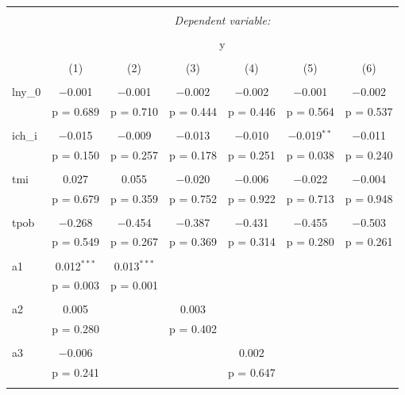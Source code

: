 \begin{table}[!htbp] \centering 
    \tiny
  \caption{} 
  \label{} 
  \begin{turn}{0}
\begin{tabular}{@{\extracolsep{5pt}}lcccccc} 
\\[-1.8ex]\hline 
\hline \\[-1.8ex] 
 & \multicolumn{6}{c}{\textit{Dependent variable:}} \\ 
\cline{2-7} 
\\[-1.8ex] & \multicolumn{6}{c}{y} \\ 
\\[-1.8ex] & (1) & (2) & (3) & (4) & (5) & (6)\\ 
\hline \\[-1.8ex] 
 lny\_0 & $-$0.001 & $-$0.001 & $-$0.002 & $-$0.002 & $-$0.001 & $-$0.002 \\ 
  & p = 0.689 & p = 0.710 & p = 0.444 & p = 0.446 & p = 0.564 & p = 0.537 \\ 
  & & & & & & \\ 
 ich\_i & $-$0.015 & $-$0.009 & $-$0.013 & $-$0.010 & $-$0.019$^{**}$ & $-$0.011 \\ 
  & p = 0.150 & p = 0.257 & p = 0.178 & p = 0.251 & p = 0.038 & p = 0.240 \\ 
  & & & & & & \\ 
 tmi & 0.027 & 0.055 & $-$0.020 & $-$0.006 & $-$0.022 & $-$0.004 \\ 
  & p = 0.679 & p = 0.359 & p = 0.752 & p = 0.922 & p = 0.713 & p = 0.948 \\ 
  & & & & & & \\ 
 tpob & $-$0.268 & $-$0.454 & $-$0.387 & $-$0.431 & $-$0.455 & $-$0.503 \\ 
  & p = 0.549 & p = 0.267 & p = 0.369 & p = 0.314 & p = 0.280 & p = 0.261 \\ 
  & & & & & & \\ 
 a1 & 0.012$^{***}$ & 0.013$^{***}$ &  &  &  &  \\ 
  & p = 0.003 & p = 0.001 &  &  &  &  \\ 
  & & & & & & \\ 
 a2 & 0.005 &  & 0.003 &  &  &  \\ 
  & p = 0.280 &  & p = 0.402 &  &  &  \\ 
  & & & & & & \\ 
 a3 & $-$0.006 &  &  & 0.002 &  &  \\ 
  & p = 0.241 &  &  & p = 0.647 &  &  \\ 
  & & & & & & \\ 

\end{tabular}
\end{turn}
\end{table}
